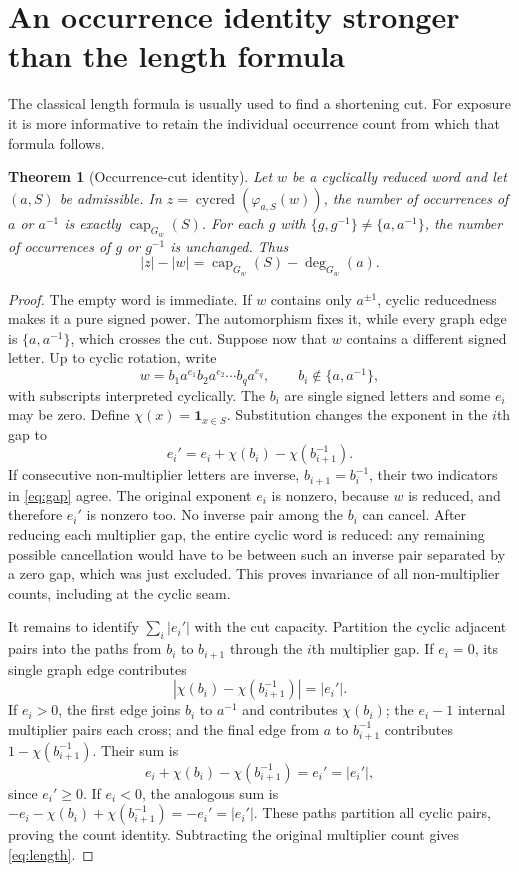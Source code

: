 \documentclass[11pt,letterpaper]{article}
\newtheorem{theorem}{Theorem}[section]
\theoremstyle{definition}\newtheorem{definition}[theorem]{Definition}
\newcommand{\cyc}{\operatorname{cycred}}
\newcommand{\capc}{\operatorname{cap}}
\newcommand{\set}[1]{\{#1\}}
\newcommand{\wh}{\varphi_{a,S}}
\begin{document}
\section{An occurrence identity stronger than the length formula}\label{sec:occurrence}
The classical length formula is usually used to find a shortening cut. For exposure it is more informative to retain the individual occurrence count from which that formula follows.

\begin{theorem}[Occurrence-cut identity]\label{thm:occurrence}
Let $w$ be a cyclically reduced word and let $(a,S)$ be admissible. In $z=\cyc(\wh(w))$, the number of occurrences of $a$ or $a^{-1}$ is exactly $\capc_{G_w}(S)$. For each $g$ with $\set{g,g^{-1}}\ne\set{a,a^{-1}}$, the number of occurrences of $g$ or $g^{-1}$ is unchanged. Thus
\begin{equation}\label{eq:length}
 |z|-|w|=\capc_{G_w}(S)-\deg_{G_w}(a).
\end{equation}
\end{theorem}
\begin{proof}
The empty word is immediate. If $w$ contains only $a^{\pm1}$, cyclic reducedness makes it a pure signed power. The automorphism fixes it, while every graph edge is $\set{a,a^{-1}}$, which crosses the cut. Suppose now that $w$ contains a different signed letter. Up to cyclic rotation, write
\[
 w=b_1a^{e_1}b_2a^{e_2}\cdots b_qa^{e_q},\qquad b_i\notin\set{a,a^{-1}},
\]
with subscripts interpreted cyclically. The $b_i$ are single signed letters and some $e_i$ may be zero. Define $\chi(x)=\mathbf1_{x\in S}$. Substitution changes the exponent in the $i$th gap to
\begin{equation}\label{eq:gap}
 e_i'=e_i+\chi(b_i)-\chi(b_{i+1}^{-1}).
\end{equation}
If consecutive non-multiplier letters are inverse, $b_{i+1}=b_i^{-1}$, their two indicators in \eqref{eq:gap} agree. The original exponent $e_i$ is nonzero, because $w$ is reduced, and therefore $e_i'$ is nonzero too. No inverse pair among the $b_i$ can cancel. After reducing each multiplier gap, the entire cyclic word is reduced: any remaining possible cancellation would have to be between such an inverse pair separated by a zero gap, which was just excluded. This proves invariance of all non-multiplier counts, including at the cyclic seam.

It remains to identify $\sum_i|e_i'|$ with the cut capacity. Partition the cyclic adjacent pairs into the paths from $b_i$ to $b_{i+1}$ through the $i$th multiplier gap. If $e_i=0$, its single graph edge contributes
\[
 |\chi(b_i)-\chi(b_{i+1}^{-1})|=|e_i'|.
\]
If $e_i>0$, the first edge joins $b_i$ to $a^{-1}$ and contributes $\chi(b_i)$; the $e_i-1$ internal multiplier pairs each cross; and the final edge from $a$ to $b_{i+1}^{-1}$ contributes $1-\chi(b_{i+1}^{-1})$. Their sum is
\[
 e_i+\chi(b_i)-\chi(b_{i+1}^{-1})=e_i'=|e_i'|,
\]
since $e_i'\ge0$. If $e_i<0$, the analogous sum is
$-e_i-\chi(b_i)+\chi(b_{i+1}^{-1})=-e_i'=|e_i'|$.
These paths partition all cyclic pairs, proving the count identity. Subtracting the original multiplier count gives \eqref{eq:length}.
\end{proof}
\end{document}
